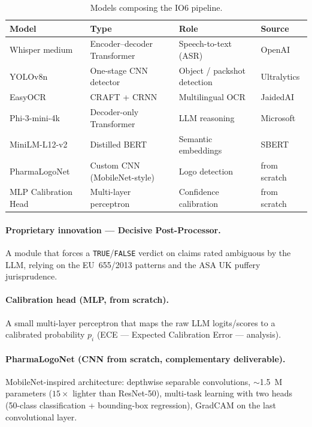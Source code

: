 \documentclass[11pt,a4paper]{article}
\newcommand{\verdict}[1]{\texttt{#1}}
\begin{document}
\begin{table}[h]
\centering
\small
\begin{tabular}{>{\raggedright\arraybackslash}p{3.2cm} >{\raggedright\arraybackslash}p{4.2cm} >{\raggedright\arraybackslash}p{4.5cm} >{\raggedright\arraybackslash}p{2.4cm}}
\toprule
\textbf{Model} & \textbf{Type} & \textbf{Role} & \textbf{Source} \\
\midrule
Whisper medium       & Encoder--decoder Transformer & Speech-to-text (ASR)            & OpenAI \\
YOLOv8n              & One-stage CNN detector       & Object / packshot detection     & Ultralytics \\
EasyOCR              & CRAFT + CRNN                 & Multilingual OCR                & JaidedAI \\
Phi-3-mini-4k        & Decoder-only Transformer     & LLM reasoning                   & Microsoft \\
MiniLM-L12-v2        & Distilled BERT               & Semantic embeddings             & SBERT \\
PharmaLogoNet        & Custom CNN (MobileNet-style) & Logo detection                  & from scratch \\
MLP Calibration Head & Multi-layer perceptron       & Confidence calibration          & from scratch \\
\bottomrule
\end{tabular}
\caption{Models composing the IO6 pipeline.}
\end{table}

\paragraph{Proprietary innovation — Decisive Post-Processor.}
A module that forces a \verdict{TRUE}/\verdict{FALSE} verdict on claims rated
ambiguous by the LLM, relying on the EU~655/2013 patterns and the ASA UK puffery
jurisprudence.

\paragraph{Calibration head (MLP, from scratch).}
A small multi-layer perceptron that maps the raw LLM logits/scores to a calibrated
probability $p_i$ (ECE --- Expected Calibration Error --- analysis).

\paragraph{PharmaLogoNet (CNN from scratch, complementary deliverable).}
MobileNet-inspired architecture: depthwise separable convolutions,
$\sim$1.5~M parameters ($15\times$ lighter than ResNet-50), multi-task learning
with two heads (50-class classification + bounding-box regression), GradCAM on the
last convolutional layer.
\end{document}
